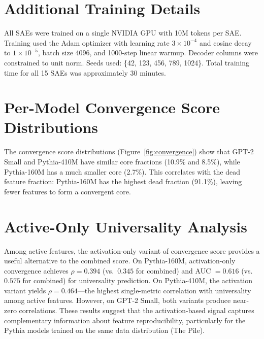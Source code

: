 \documentclass[final]{article}
\begin{document}



\appendix

\section{Additional Training Details}

All SAEs were trained on a single NVIDIA GPU with 10M tokens per SAE. Training used the Adam optimizer with learning rate $3 \times 10^{-4}$ and cosine decay to $1 \times 10^{-5}$, batch size 4096, and 1000-step linear warmup. Decoder columns were constrained to unit norm. Seeds used: \{42, 123, 456, 789, 1024\}. Total training time for all 15 SAEs was approximately 30 minutes.

\section{Per-Model Convergence Score Distributions}

The convergence score distributions (Figure~\ref{fig:convergence}) show that GPT-2 Small and Pythia-410M have similar core fractions (10.9\% and 8.5\%), while Pythia-160M has a much smaller core (2.7\%). This correlates with the dead feature fraction: Pythia-160M has the highest dead fraction (91.1\%), leaving fewer features to form a convergent core.

\section{Active-Only Universality Analysis}

Among active features, the activation-only variant of convergence score provides a useful alternative to the combined score. On Pythia-160M, activation-only convergence achieves $\rho = 0.394$ (vs.\ $0.345$ for combined) and AUC $= 0.616$ (vs.\ $0.575$ for combined) for universality prediction. On Pythia-410M, the activation variant yields $\rho = 0.464$---the highest single-metric correlation with universality among active features. However, on GPT-2 Small, both variants produce near-zero correlations. These results suggest that the activation-based signal captures complementary information about feature reproducibility, particularly for the Pythia models trained on the same data distribution (The Pile).
\end{document}
